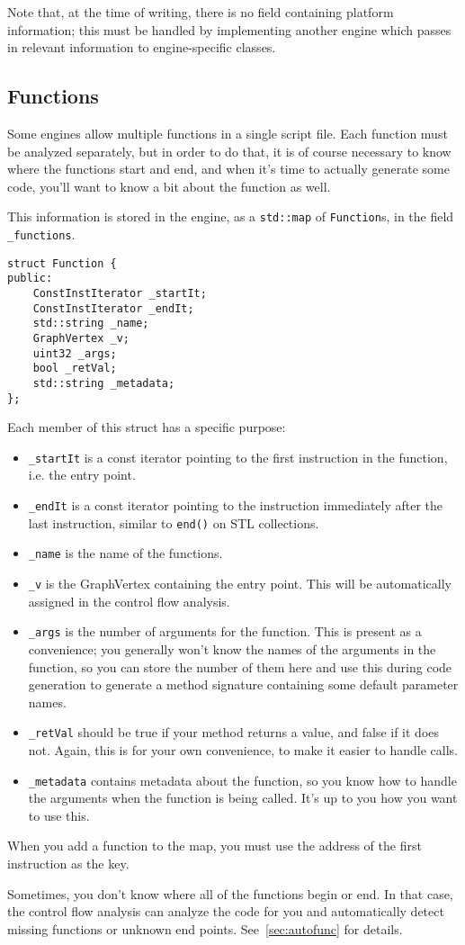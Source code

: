 Note that, at the time of writing, there is no field containing platform information; this must be handled by implementing another engine which passes in relevant information to engine-specific classes.

\subsection{Functions}
Some engines allow multiple functions in a single script file. Each function must be analyzed separately, but in order to do that, it is of course necessary to know where the functions start and end, and when it's time to actually generate some code, you'll want to know a bit about the function as well.

This information is stored in the engine, as a \verb+std::map+ of \verb+Function+s, in the field \verb+ _functions+.

\begin{C++}
\begin{lstlisting}
struct Function {
public:
	ConstInstIterator _startIt;
	ConstInstIterator _endIt;
	std::string _name;
	GraphVertex _v;
	uint32 _args;
	bool _retVal;
	std::string _metadata;
};
\end{lstlisting}
\end{C++}

Each member of this struct has a specific purpose:
\begin{itemize}
\item \verb+_startIt+ is a const iterator pointing to the first instruction in the function, i.e. the entry point.
\item \verb+_endIt+ is a const iterator pointing to the instruction immediately after the last instruction, similar to \verb+end()+ on STL collections.
\item \verb+_name+ is the name of the functions.
\item \verb+_v+ is the GraphVertex containing the entry point. This will be automatically assigned in the control flow analysis.
\item \verb+_args+ is the number of arguments for the function. This is present as a convenience; you generally won't know the names of the arguments in the function, so you can store the number of them here and use this during code generation to generate a method signature containing some default parameter names.
\item \verb+_retVal+ should be true if your method returns a value, and false if it does not. Again, this is for your own convenience, to make it easier to handle calls.
\item \verb+_metadata+ contains metadata about the function, so you know how to handle the arguments when the function is being called. It's up to you how you want to use this.
\end{itemize}

When you add a function to the map, you must use the address of the first instruction as the key.

Sometimes, you don't know where all of the functions begin or end. In that case, the control flow analysis can analyze the code for you and automatically detect missing functions or unknown end points. See~\vref{sec:autofunc} for details.
